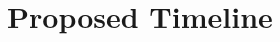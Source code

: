 \documentclass[10pt,twocolumn]{article}
\begin{document}



\section {Proposed Timeline}
\end{document}
